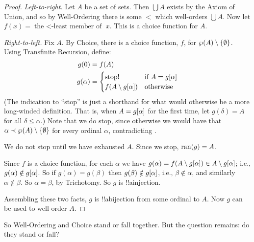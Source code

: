 \documentclass[../../../include/open-logic-section]{subfiles}
\begin{document}
\begin{proof}
\emph{Left-to-right.} Let $A$ be a set of sets. Then $\bigcup A$
exists by the Axiom of Union, and so by Well-Ordering there is some
$<$ which well-orders $\bigcup A$. Now let $f(x) = \text{the $<$-least
member of }x$. This is a choice function for $A$.

\emph{Right-to-left.} Fix $A$. By Choice, there is a choice function,
$f$,  for $\wp(A) \setminus \{\emptyset\}$. Using Transfinite
Recursion, define:
\begin{align*}
	g(0) &= f(A)\\
	g(\alpha) &= 
		\begin{cases}
			\text{stop\bang} &\text{if }A = \funimage{g}{\alpha}\\
			f(A \setminus \funimage{g}{\alpha}) & \text{otherwise}\\	
		\end{cases}
\end{align*}
(The indication to ``stop\bang'' is just a shorthand for what would
otherwise be a more long-winded definition. That is, when $A =
g[\alpha]$ for the first time, let $g(\delta) = A$ for all
$\delta \leq \alpha$.) Note that we do stop, since otherwise we would
have that $\alpha \prec \wp(A) \setminus \{\emptyset\}$ for
every ordinal $\alpha$, contradicting . 

We do not stop  until we have exhausted $A$. Since we stop, $\mathrm{ran}(g) =
A$. 

Since $f$ is a choice function, for each $\alpha$ we have $g(\alpha) =
f(A \setminus g[\alpha]) \in A \setminus
g[\alpha]$; i.e., $g(\alpha) \notin g[\alpha]$.
So if $g(\alpha) = g(\beta)$ then $g(\beta) \notin
g[\alpha]$, i.e., $\beta \notin \alpha$, and similarly
$\alpha \notin \beta$. So $\alpha = \beta$, by Trichotomy. So $g$ is
!!a{injection}.

Assembling these two facts, $g$ is !!a{bijection} from some ordinal to $A$. Now $g$ can be used to well-order $A$.
\end{proof}

So Well-Ordering and Choice stand or fall together. But the question
remains: do they stand or fall?
\end{document}
